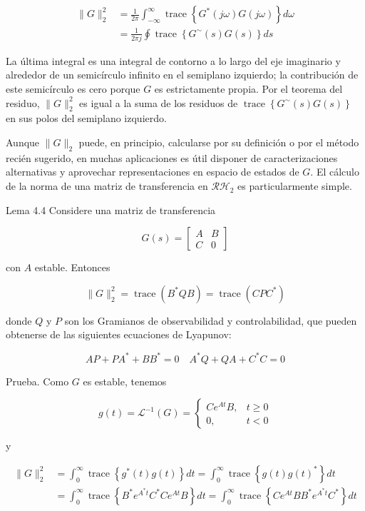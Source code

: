 $$
\begin{aligned}
\|G\|_{2}^{2} & =\frac{1}{2 \pi} \int_{-\infty}^{\infty} \operatorname{trace}\left\{G^{*}(j \omega) G(j \omega)\right\} d \omega \\
& =\frac{1}{2 \pi j} \oint \operatorname{trace}\left\{G^{\sim}(s) G(s)\right\} d s
\end{aligned}
$$

La última integral es una integral de contorno a lo largo del eje imaginario y alrededor de un semicírculo infinito en el semiplano izquierdo; la contribución de este semicírculo es cero porque $G$ es estrictamente propia. Por el teorema del residuo, $\|G\|_{2}^{2}$ es igual a la suma de los residuos de $\operatorname{trace}\left\{G^{\sim}(s) G(s)\right\}$ en sus polos del semiplano izquierdo.

Aunque $\|G\|_{2}$ puede, en principio, calcularse por su definición o por el método recién sugerido, en muchas aplicaciones es útil disponer de caracterizaciones alternativas y aprovechar representaciones en espacio de estados de $G$. El cálculo de la norma de una matriz de transferencia en $\mathcal{R H}_{2}$ es particularmente simple.

Lema 4.4 Considere una matriz de transferencia

$$
G(s)=\left[\begin{array}{c|c}
A & B \\
\hline C & 0
\end{array}\right]
$$

con $A$ estable. Entonces


\begin{equation*}
\|G\|_{2}^{2}=\operatorname{trace}\left(B^{*} Q B\right)=\operatorname{trace}\left(C P C^{*}\right) \tag{4.1}
\end{equation*}


donde $Q$ y $P$ son los Gramianos de observabilidad y controlabilidad, que pueden obtenerse de las siguientes ecuaciones de Lyapunov:

$$
A P+P A^{*}+B B^{*}=0 \quad A^{*} Q+Q A+C^{*} C=0
$$

Prueba. Como $G$ es estable, tenemos

$$
g(t)=\mathcal{L}^{-1}(G)= \begin{cases}C e^{A t} B, & t \geq 0 \\
0, & t<0\end{cases}
$$

y

$$
\begin{aligned}
\|G\|_{2}^{2} & =\int_{0}^{\infty} \operatorname{trace}\left\{g^{*}(t) g(t)\right\} d t=\int_{0}^{\infty} \operatorname{trace}\left\{g(t) g(t)^{*}\right\} d t \\
& =\int_{0}^{\infty} \operatorname{trace}\left\{B^{*} e^{A^{*} t} C^{*} C e^{A t} B\right\} d t=\int_{0}^{\infty} \operatorname{trace}\left\{C e^{A t} B B^{*} e^{A^{*} t} C^{*}\right\} d t
\end{aligned}
$$

